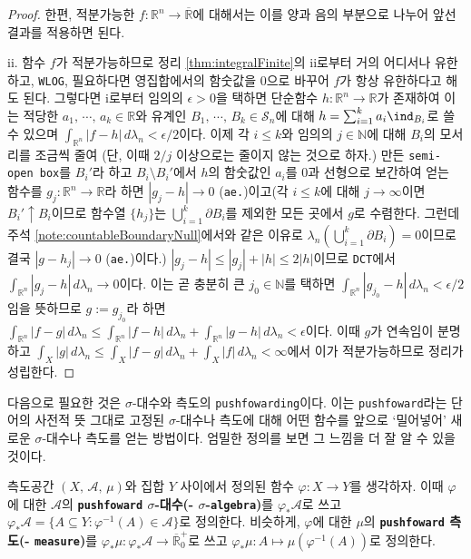 \begin{proof}
    한편, 적분가능한 $f:\mathbb{R}^n\to\overline{\mathbb{R}}$에 대해서는 이를 양과 음의 부분으로 나누어 앞선 결과를 적용하면 된다.

    ii. 함수 $f$가 적분가능하므로 정리 \ref{thm:integralFinite}의 ii로부터 거의 어디서나 유한하고, \texttt{WLOG}, 필요하다면 영집합에서의 함숫값을 $0$으로 바꾸어 $f$가 항상 유한하다고 해도 된다. 그렇다면 i로부터 임의의 $\epsilon>0$을 택하면 단순함수 $h:\mathbb{R}^n\to\mathbb{R}$가 존재하여 이는 적당한 $a_1,\,\cdots,\,a_k\in\mathbb{R}$와 유계인 $B_1,\,\cdots,\,B_k\in\mathcal{S}_n$에 대해 $h=\sum_{i=1}^ka_i\ind_{B_i}$로 쓸 수 있으며 $\int_{\mathbb{R}^n}|f-h|\,d\lambda_n<\epsilon/2$이다. 이제 각 $i\leq k$와 임의의 $j\in\mathbb{N}$에 대해 $B_i$의 모서리를 조금씩 줄여 (단, 이때 $2/j$ 이상으로는 줄이지 않는 것으로 하자.) 만든 \texttt{semi-open box}를 $B_i'$라 하고 $B_i\setminus B_i'$에서 $h$의 함숫값인 $a_i$를 $0$과 선형으로 보간하여 얻는 함수를 $g_j:\mathbb{R}^n\to\mathbb{R}$라 하면 $|g_j-h|\to0$ (\texttt{ae.})이고(각 $i\leq k$에 대해 $j\to\infty$이면 $B_i'\uparrow B_i$이므로 함수열 $\{h_j\}$는 $\bigcup_{i=1}^k\partial B_i$를 제외한 모든 곳에서 $g$로 수렴한다. 그런데 주석 \ref{note:countableBoundaryNull}에서와 같은 이유로 $\lambda_n(\bigcup_{i=1}^k\partial B_i)=0$이므로 결국 $|g-h_j|\to0$ (\texttt{ae.})이다.) $|g_j-h|\leq|g_j|+|h|\leq2|h|$이므로 \texttt{DCT}에서 $\int_{\mathbb{R}^n}|g_j-h|\,d\lambda_n\to0$이다. 이는 곧 충분히 큰 $j_0\in\mathbb{N}$를 택하면 $\int_{\mathbb{R}^n}|g_{j_0}-h|\,d\lambda_n<\epsilon/2$임을 뜻하므로 $g:=g_{j_0}$라 하면 $\int_{\mathbb{R}^n}|f-g|\,d\lambda_n\leq\int_{\mathbb{R}^n}|f-h|\,d\lambda_n+\int_{\mathbb{R}^n}|g-h|\,d\lambda_n<\epsilon$이다. 이때 $g$가 연속임이 분명하고 $\int_X|g|\,d\lambda_n\leq\int_X|f-g|\,d\lambda_n+\int_X|f|\,d\lambda_n<\infty$에서 이가 적분가능하므로 정리가 성립한다.
\end{proof}

다음으로 필요한 것은 $\sigma$-대수와 측도의 \texttt{pushfowarding}이다. 이는 \texttt{pushfoward}라는 단어의 사전적 뜻 그대로 고정된 $\sigma$-대수나 측도에 대해 어떤 함수를 앞으로 `밀어넣어' 새로운 $\sigma$-대수나 측도를 얻는 방법이다. 엄밀한 정의를 보면 그 느낌을 더 잘 알 수 있을 것이다.

\begin{definition}
    측도공간 $(X,\,\mathcal{A},\,\mu)$와 집합 $Y$ 사이에서 정의된 함수 $\varphi:X\to Y$를 생각하자. 이때 $\varphi$에 대한 $\mathcal{A}$의 \textbf{\texttt{pushfoward} $\sigma$-대수(- $\sigma$-\texttt{algebra})}를 $\varphi_*\mathcal{A}$로 쓰고 $\varphi_*\mathcal{A}=\{A\subseteq Y:\varphi^{-1}(A)\in\mathcal{A}\}$로 정의한다. 비슷하게, $\varphi$에 대한 $\mu$의 \textbf{\texttt{pushfoward} 측도(- \texttt{measure})}를 $\varphi_*\mu:\varphi_*\mathcal{A}\to\overline{\mathbb{R}}^+_0$로 쓰고 $\varphi_*\mu:A\mapsto\mu(\varphi^{-1}(A))$로 정의한다.
\end{definition}

